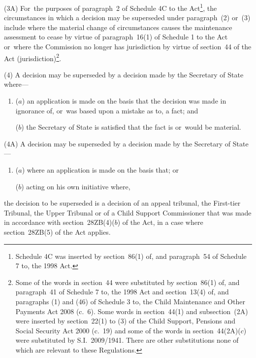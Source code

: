 \documentclass[a4paper,12pt]{article}
\begin{document}
(3A) For~the purposes of paragraph~2 of Schedule 4C to the Act\footnote{Schedule 4C was inserted by section~86(1) of, and paragraph~54 of Schedule 7 to, the 1998 Act.}, the circumstances in which a decision may be superseded under paragraph~(2) or~(3) include where the material change of circumstances causes the maintenance assessment to cease by virtue of paragraph~16(1) of Schedule 1 to the Act or~where the Commission no longer has jurisdiction by virtue of section~44 of the Act (jurisdiction)\footnote{Some of the words in section~44 were substituted by section~86(1) of, and paragraph~41 of Schedule 7 to, the 1998 Act and section~13(4) of, and paragraphs (1) and (46) of Schedule 3 to, the Child Maintenance and Other Payments Act 2008 (c.~6). Some words in section~44(1) and subsection~(2A) were inserted by section~22(1) to (3) of the Child Support, Pensions and Social Security Act 2000 (c.~19) and some of the words in section~44(2A)($c$)  were substituted by S.I.~2009/1941. There are other substitutions none of which are relevant to these Regulations.}.

(4) A decision may be superseded by a decision made by the Secretary of State where---
\begin{enumerate}\item[]
($a$) an application is made on the basis that the decision was made in ignorance of, or~was based upon a mistake as to, a fact; and

($b$) the Secretary of State is satisfied that the fact is or~would be material.
\end{enumerate}

(4A) A decision may be superseded by a decision made by the Secretary of State—
\begin{enumerate}\item[]
($a$) where an application is made on the basis that; or

($b$) acting on his own initiative where,
\end{enumerate}
the decision to be superseded is a decision of 
an appeal tribunal, the First-tier Tribunal, the Upper Tribunal or of a Child Support Commissioner  %
that was made in accordance with section~28ZB(4)($b$)  of the Act, in a case where section~28ZB(5) of the Act applies.
\end{document}
